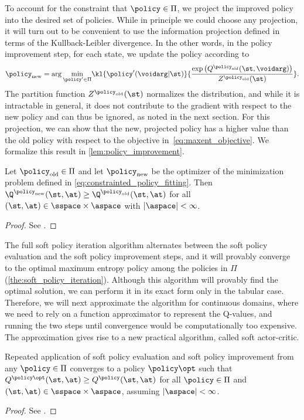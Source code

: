 \documentclass{article}
\begin{document}
%
To account for the constraint that $\policy \in \Pi$, we project the improved policy into the desired set of policies. While in principle we could choose any projection, it will turn out to be convenient to use the information projection defined in terms of the Kullback-Leibler divergence. In the other words, in the policy improvement step, for each state, we update the policy according to
\begin{align}
%
%
%
\policy_\mathrm{new} = \arg\underset{\policy'\in \Pi}{\min}\kl{\policy'(\voidarg|\st)}{\frac{\exp\left(Q^{\policy_\mathrm{old}}(\st, \voidarg)\right)}{Z^{\policy_\mathrm{old}}(\st)}}.
%
\label{eq:constrainted_policy_fitting}
\end{align}
The partition function $Z^{\policy_\mathrm{old}}(\st)$ normalizes the distribution, and while it is intractable in general, it does not contribute to the gradient with respect to the new policy and can thus be ignored, as noted in the next section. For this projection, we can show that the new, projected policy has a higher value than the old policy with respect to the objective in~\autoref{eq:maxent_objective}. We formalize this result in \autoref{lem:policy_improvement}.
\begin{lemma}
\label{lem:policy_improvement}
Let $\policy_\mathrm{old} \in \Pi$ and let $\policy_\mathrm{new}$ be the optimizer of the minimization problem defined in \autoref{eq:constrainted_policy_fitting}. Then $\Q^{\policy_\mathrm{new}}(\st, \at) \geq \Q^{\policy_\mathrm{old}}(\st, \at)$ for all $(\st, \at) \in \sspace\times\aspace$ with $|\aspace|<\infty$.
\begin{proof}
See .
\end{proof}
\end{lemma}
The full soft policy iteration algorithm alternates between the soft policy evaluation and the soft policy improvement steps, and it will provably converge to the optimal maximum entropy policy among the policies in $\Pi$ (\autoref{the:soft_policy_iteration}). Although this algorithm will provably find the optimal solution, we can perform it in its exact form only in the tabular case. Therefore, we will next approximate the algorithm for continuous domains, where we need to rely on a function approximator to represent the Q-values, and running the two steps until convergence would be computationally too expensive. The approximation gives rise to a new practical algorithm, called soft actor-critic.
\begin{theorem}
\label{the:soft_policy_iteration}
Repeated application of soft policy evaluation and soft policy improvement from any $\policy\in\Pi$ converges to a policy $\policy\opt$ such that $Q^{\policy\opt}(\st, \at) \geq Q^{\policy}(\st, \at)$ for all $\policy \in \Pi$ and $(\st, \at) \in \sspace\times\aspace$, assuming $|\aspace|<\infty$.
\begin{proof}
See .
\end{proof}
\end{theorem}
\end{document}
